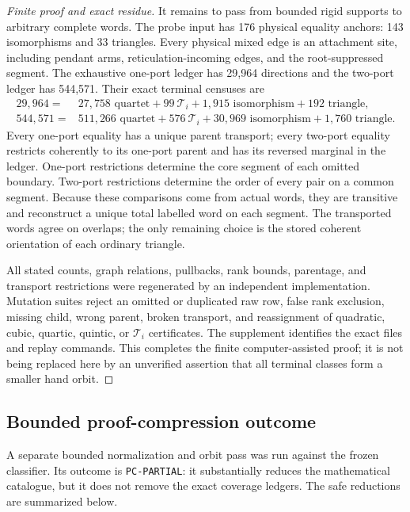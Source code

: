 \documentclass[11pt]{article}
\theoremstyle{remark}
\newcommand{\1}{\mathbf 1}
\begin{document}
\begin{proof}[Finite proof and exact residue]
It remains to pass from bounded rigid supports to arbitrary complete words.
The probe input has 176 physical equality anchors: 143 isomorphisms and 33
triangles.  Every physical mixed edge is an attachment site, including
pendant arms, reticulation-incoming edges, and the root-suppressed segment.
The exhaustive one-port ledger has 29,964 directions and the two-port ledger
has 544,571.  Their exact terminal censuses are
\begin{align*}
29{,}964={}&27{,}758\text{ quartet}+99\ \mathcal T_i
 +1{,}915\text{ isomorphism}+192\text{ triangle},\\
544{,}571={}&511{,}266\text{ quartet}+576\ \mathcal T_i
 +30{,}969\text{ isomorphism}+1{,}760\text{ triangle}.
\end{align*}
Every one-port equality has a unique parent transport; every two-port
equality restricts coherently to its one-port parent and has its reversed
marginal in the ledger.  One-port restrictions determine the core segment of
each omitted boundary.  Two-port restrictions determine the order of every
pair on a common segment.  Because these comparisons come from actual words,
they are transitive and reconstruct a unique total labelled word on each
segment.  The transported words agree on overlaps; the only remaining choice
is the stored coherent orientation of each ordinary triangle.

All stated counts, graph relations, pullbacks, rank bounds, parentage, and
transport restrictions were regenerated by an independent implementation.
Mutation suites reject an omitted or duplicated raw row, false rank
exclusion, missing child, wrong parent, broken transport, and reassignment of
quadratic, cubic, quartic, quintic, or \(\mathcal T_i\) certificates.  The
supplement identifies the exact files and replay commands.  This completes
the finite computer-assisted proof; it is not being replaced here by an
unverified assertion that all terminal classes form a smaller hand orbit.
\end{proof}

\subsection{Bounded proof-compression outcome}

A separate bounded normalization and orbit pass was run against the frozen
classifier.  Its outcome is \texttt{PC-PARTIAL}: it substantially reduces the
mathematical catalogue, but it does not remove the exact coverage ledgers.
The safe reductions are summarized below.
\end{document}
